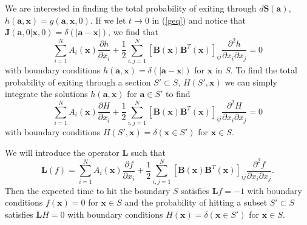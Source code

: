 \documentclass{article}
\newcommand{\mb}{\mathbf}
\begin{document}
We are interested in finding the total probability of exiting through $d{\mb S}({\mb a})$, $h({\mb a},{\mb x})=g({\mb a},{\mb x},0)$.  If we let $t\to 0$ in (\ref{geq}) and notice that ${\mb J}({\mb a},0|{\mb x},0)=\delta(|{\mb a}-{\mb x}|)$, we find that 
\begin{equation*}
\sum_{i=1}^NA_i({\mb x})\frac{\partial h}{\partial x_i}+\frac{1}{2}\sum_{i,j=1}^N[{\mb B}({\mb x}){\mb B}^T({\mb x})]_{ij}\frac{\partial ^2 h}{\partial x_i\partial x_j}=0
\end{equation*}
with boundary conditions $h({\mb a},{\mb x})=\delta(|{\mb a}-{\mb x}|)$ for ${\mb x}$ in $S$. To find the total probability of exiting through a section $S'\subset S$, $H(S',{\mb x})$ we can simply integrate the solutions $h({\mb a},{\mb x})$ for ${\mb a}\in S'$ to find 
\begin{equation}
\sum_{i=1}^NA_i({\mb x})\frac{\partial H}{\partial x_i}+\frac{1}{2}\sum_{i,j=1}^N[{\mb B}({\mb x}){\mb B}^T({\mb x})]_{ij}\frac{\partial ^2 H}{\partial x_i\partial x_j}=0 \label{ER}
\end{equation}
with boundary conditions $H(S',{\mb x})=\delta({\mb x}\in S')$ for ${\mb x}\in S$.

We will introduce the operator ${\mb L}$ such that 
\begin{equation}
{\mb L}(f)=\sum_{i=1}^NA_i({\mb x})\frac{\partial f}{\partial x_i}+\frac{1}{2}\sum_{i,j=1}^N[{\mb B}({\mb x}){\mb B}^T({\mb x})]_{ij}\frac{\partial ^2 f}{\partial x_i\partial x_j}. \label{operator}
\end{equation}
Then the expected time to hit the boundary $S$ satisfies ${\mb L}f=-1$ with boundary conditions $f({\mb x})=0$ for ${\mb x}\in S$ and the probability of hitting a subset $S'\subset S$ satisfies ${\mb L}H=0$ with boundary conditions $H({\mb x})=\delta({\mb x}\in S')$ for ${\mb x}\in S$.
\end{document}
